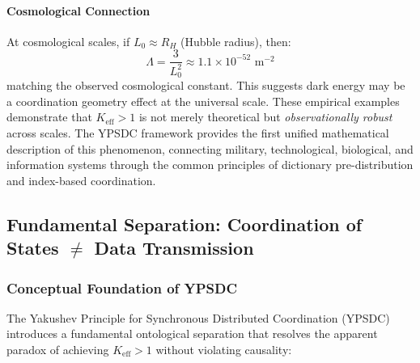 \documentclass[11pt,a4paper]{article}
\begin{document}
	\paragraph{Cosmological Connection}
	At cosmological scales, if $L_0 \approx R_H$ (Hubble radius), then:
	\begin{equation}
		\Lambda = \frac{3}{L_0^2} \approx 1.1 \times 10^{-52} \text{ m}^{-2}
	\end{equation}
	matching the observed cosmological constant. This suggests dark energy 
	may be a coordination geometry effect at the universal scale.
	These empirical examples demonstrate that $K_{\mathrm{eff}} > 1$ is not merely theoretical but \emph{observationally robust} across scales. The YPSDC framework provides the first unified mathematical description of this phenomenon, connecting military, technological, biological, and information systems through the common principles of dictionary pre-distribution and index-based coordination.
	
	\subsection{Fundamental Separation: Coordination of States $\neq$ Data Transmission}
	\label{subsec:coordination-vs-data}
	
	\subsubsection{Conceptual Foundation of YPSDC}
	
	The Yakushev Principle for Synchronous Distributed Coordination (YPSDC) introduces a fundamental ontological separation that resolves the apparent paradox of achieving $K_{\mathrm{eff}} > 1$ without violating causality:
	
\end{document}
